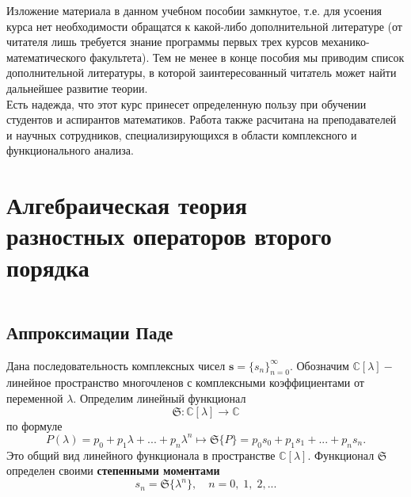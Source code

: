 \documentclass[12pt,a4paper]{article}
\theoremstyle{plain}   \newtheorem{Pro}{Задача}
\begin{document}
Изложение материала в данном учебном пособии замкнутое,
т.е. для усоения курса нет необходимости обращатся к какой-либо
дополнительной литературе (от читателя лишь требуется знание
программы первых трех курсов механико-математического факультета).
Тем не менее в конце пособия мы приводим список дополнительной
литературы, в которой заинтересованный читатель может найти дальнейшее
развитие теории. \\

Есть надежда, что этот курс принесет определенную пользу
при обучении студентов и аспирантов математиков.
Работа также расчитана на преподавателей и научных сотрудников,
специализирующихся в области комплексного и функционального
анализа.
\newpage
\section {Алгебраическая теория\\
разностных операторов второго порядка}
$ \; $
\\
$ \; $
\subsection{Аппроксимации Паде}
$ \; $
\\

Дана последовательность комплексных чисел
$ \mathbf{s}=\{s_n \}_{n=0}^{\infty}. $
Обозначим
$ \mathbb{C}[\lambda ] - $
линейное пространство многочленов с комплексными коэффициентами
от переменной
$ \lambda . $
Определим линейный функционал
$$
  \mathfrak{S} : \mathbb{C} [\lambda ]
  \longrightarrow \mathbb{C}
$$
по формуле
$$
  P(\lambda )=p_0 + p_1 \lambda +...+p_n \lambda ^n
  \mapsto \mathfrak{S} \{ P \} =
  p_0 s_0 + p_1 s_1 +...+p_n s_n .
$$
Это общий вид линейного функционала в пространстве
$ \mathbb{C}[\lambda ]. $
Функционал
$ \mathfrak{S} $
определен своими
{\bfseries степенными моментами}
$$
  s_n = \mathfrak{S} \{ \lambda ^n \} ,
  \quad n=0, \; 1, \; 2, ...
$$
\\
\end{document}
